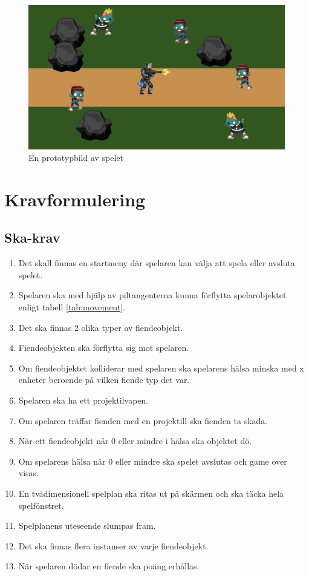 \documentclass{TDP005mall}
\begin{document}
\begin{figure}[H]
  \includegraphics[width=\linewidth]{test.png}
  \caption {En prototypbild av spelet}
  \label {fig:picture}
\end {figure}

\section{Kravformulering}
\subsection{Ska-krav}
\begin{enumerate}[label=S\arabic*]
\item Det skall finnas en startmeny där spelaren kan välja att spela eller avsluta spelet.
\item Spelaren ska med hjälp av piltangenterna kunna förflytta spelarobjektet enligt tabell \ref{tab:movement}.
\item Det ska finnas 2 olika typer av fiendeobjekt.
\item Fiendeobjekten ska förflytta sig mot spelaren.
\item Om fiendeobjektet kolliderar med spelaren ska spelarens hälsa minska med x enheter beroende på vilken fiende typ det var.
\item Spelaren ska ha ett projektilvapen.
\item Om spelaren träffar fienden med en projektill ska fienden ta skada.
\item När ett fiendeobjekt når 0 eller mindre i hälsa ska objektet dö.
\item Om spelarens hälsa når 0 eller mindre ska spelet avslutas och game over visas.
\item En tvådimensionell spelplan ska ritas ut på skärmen och ska täcka hela spelfönstret.
\item Spelplanens uteseende slumpas fram.
\item Det ska finnas flera instanser av varje fiendeobjekt.
\item När spelaren dödar en fiende ska poäng erhållas.
\end{enumerate}
\end{document}
